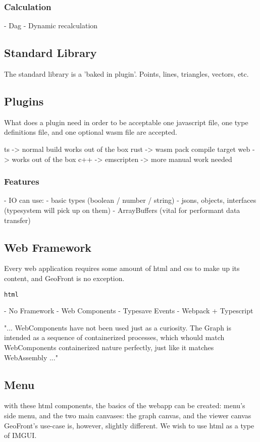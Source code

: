 \subsubsection*{Calculation}
  - Dag
  - Dynamic recalculation 





\subsection{ Standard Library }

The standard library is a 'baked in plugin'.
Points, lines, triangles, vectors, etc.

\subsection{ Plugins }
What does a plugin need in order to be acceptable
one javascript file, one type definitions file, and one optional wasm file are accepted. 

ts -> normal build works out of the box
rust -> wasm pack compile target web -> works out of the box 
c++ -> emscripten -> more manual work needed 

\subsubsection{Features}
- IO can use:
  - basic types (boolean / number / string)
  - jsons, objects, interfaces (typesystem will pick up on them)
  - ArrayBuffers (vital for performant data transfer)







\subsection{Web Framework}
Every web application requires some amount of html and css to make up its content, and GeoFront is no exception. 

\verb|html| 

- No Framework
- Web Components
- Typesave Events
- Webpack + Typescript

"...
WebComponents have not been used just as a curiosity. 
The Graph is intended as a sequence of containerized processes, 
which whould match WebComponents containerized nature perfectly, just like it matches WebAssembly
..."

\subsection{Menu}
with these html components, the basics of the webapp can be created: menu's side menu, and the two main canvases: the graph canvas, and the viewer canvas 
GeoFront's use-case is, however, slightly different. We wish to use html as a type of IMGUI. 




